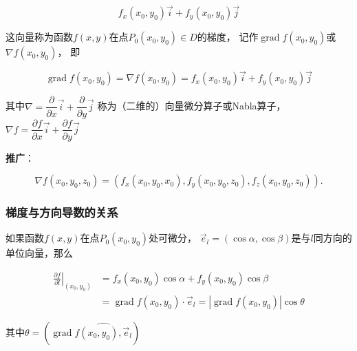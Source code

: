 \documentclass[12pt, a4paper]{article}
\numberwithin{equation}{section}
\begin{document}
    \begin{equation}
        f_x\left(x_0, y_0\right) \overrightarrow{i}+f_y\left(x_0, y_0\right) \overrightarrow{j}
    \end{equation}

    这向量称为函数\(f\left(x,y\right)\)在点\(P_0\left(x_0,y_0\right) \in D\)的梯度，
    记作\(\operatorname{grad} f\left(x_0,y_0\right)\)或\(\nabla f\left(x_0,y_0\right)\)，
    即

    \begin{equation}
        \operatorname{grad} f\left(x_0, y_0\right)=\nabla f\left(x_0, y_0\right)=
        f_x\left(x_0, y_0\right) \overrightarrow{i}+f_y\left(x_0, y_0\right) \overrightarrow{j}
    \end{equation}

    其中$\nabla=\dfrac{\partial}{\partial x} \overrightarrow{i}+\dfrac{\partial}{\partial y} \overrightarrow{j}$
    称为（二维的）向量微分算子或Nabla算子，
    $\nabla f=\dfrac{\partial f}{\partial x} \overrightarrow{i}+\dfrac{\partial f}{\partial y} \overrightarrow{j}$

    \textbf{推广}：

    $$
        \nabla f\left(x_0, y_0, z_0\right)=\left(f_x\left(x_0, y_0, x_0\right),
        f_y\left(x_0, y_0, z_0\right), f_z\left(x_0, y_0, z_0\right)\right) .
    $$

\subsubsection{梯度与方向导数的关系}

    如果函数\(f\left(x,y\right)\)在点\(P_0\left(x_0,y_0\right)\)处可微分，
    \(\overrightarrow{e}_l=\left(\cos \alpha, \cos \beta\right)\)是与\(l\)同方向的单位向量，那么

    \begin{equation}
        \begin{aligned}
        \left.\frac{\partial f}{\partial l}\right|_{\left(x_0, y_0\right)} & =f_x\left(x_0, y_0\right) \cos \alpha+f_y\left(x_0, y_0\right) \cos \beta \\
        & =\operatorname{grad} f\left(x_0, y_0\right) \cdot \overrightarrow{e}_l=\left|\operatorname{grad} f\left(x_0, y_0\right)\right| \cos \theta
        \end{aligned}
    \end{equation}

    其中$\theta=\left(\operatorname{grad} \widehat{f\left(x_0, y_0\right), \overrightarrow{e}_l}\right)$
\end{document}
